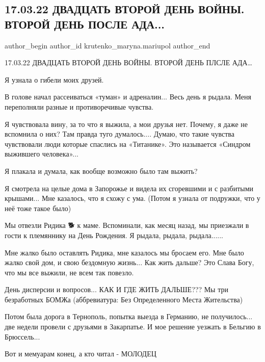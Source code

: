  
 
 
 
 

\subsection{17.03.22 ДВАДЦАТЬ ВТОРОЙ ДЕНЬ ВОЙНЫ. ВТОРОЙ ДЕНЬ ПОСЛЕ АДА...}
\label{sec:17_03_2023.fb.krutenko_maryna.mariupol.1.17_03_22_dvadtsat_vt}

\ifcmt
 author_begin
   author_id krutenko_maryna.mariupol
 author_end
\fi

17.03.22 ДВАДЦАТЬ ВТОРОЙ ДЕНЬ ВОЙНЫ. ВТОРОЙ ДЕНЬ ПЛСЛЕ АДА…

Я узнала о гибели моих друзей.

В голове начал рассеиваться «туман» и адреналин... Весь день я рыдала. Меня
переполняли разные и противоречивые чувства. 

Я чувствовала вину, за то что я выжила, а мои друзья нет. Почему, я даже не
вспомнила о них? Там правда туго думалось.... Думаю, что такие чувства
чувствовали люди которые спаслись на «Титанике». Это называется «Синдром
выжившего человека»...

Я плакала и думала, как вообще возможно было там выжить? 

Я смотрела на целые дома в Запорожье и видела их сгоревшими и с разбитыми
крышами... Мне казалось, что я схожу с ума. (Потом я узнала от подружки, что у
неё тоже такое было)

Мы отвезли Ридика 🐕 к маме. Вспоминали, как месяц назад, мы приезжали в гости
к племяннику на День Рождения. Я рыдала, рыдала, рыдала......

Мне жалко было оставлять Ридика, мне казалось мы бросаем его. Мне было жалко
свой дом, и свою бездомную жизнь... Как жить дальше? Это Слава Богу, что мы все
выжили, не всем так повезло. 

День дисперсии и вопросов... КАК И ГДЕ ЖИТЬ ДАЛЬШЕ??? Мы три безработных БОМЖа
(аббревиатура: Без Определенного Места Жительства)

Потом была дорога в Тернополь, попытка выезда в Германию, не получилось... две
недели провели с друзьями в Закарпатье. И мое решение уезжать в Бельгию в
Брюссель...

Вот и мемуарам конец, а кто читал - МОЛОДЕЦ


